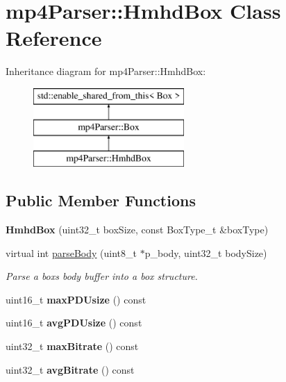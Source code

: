 \hypertarget{classmp4_parser_1_1_hmhd_box}{}\section{mp4\+Parser\+::Hmhd\+Box Class Reference}
\label{classmp4_parser_1_1_hmhd_box}
Inheritance diagram for mp4\+Parser\+::Hmhd\+Box\+:\begin{figure}[H]
\begin{center}
\leavevmode
\includegraphics[height=3.000000cm]{classmp4_parser_1_1_hmhd_box}
\end{center}
\end{figure}
\subsection*{Public Member Functions}
\begin{DoxyCompactItemize}
\item 
\mbox{\label{classmp4_parser_1_1_hmhd_box_a9f1a3801904196c91fd927d0f44925e3}} 
{\bfseries Hmhd\+Box} (uint32\+\_\+t box\+Size, const Box\+Type\+\_\+t \&box\+Type)
\item 
virtual int \mbox{\hyperlink{classmp4_parser_1_1_hmhd_box_a78bdbbff24ea09eb8844323364879f78}{parse\+Body}} (uint8\+\_\+t $\ast$p\+\_\+body, uint32\+\_\+t body\+Size)
\begin{DoxyCompactList}\small\item\em Parse a box\textquotesingle{}s body buffer into a box structure. \end{DoxyCompactList}\item 
\mbox{\label{classmp4_parser_1_1_hmhd_box_ad4957ca5940ceedfa44670816f69991c}} 
uint16\+\_\+t {\bfseries max\+P\+D\+Usize} () const
\item 
\mbox{\label{classmp4_parser_1_1_hmhd_box_a8314a6d3edc870c6cda196349085d562}} 
uint16\+\_\+t {\bfseries avg\+P\+D\+Usize} () const
\item 
\mbox{\label{classmp4_parser_1_1_hmhd_box_a0ace5d6d42cdfcc4b7d0c6bcbe2f29f5}} 
uint32\+\_\+t {\bfseries max\+Bitrate} () const
\item 
\mbox{\label{classmp4_parser_1_1_hmhd_box_aef578828ba59694a583cef29f9a5ef81}} 
uint32\+\_\+t {\bfseries avg\+Bitrate} () const
\end{DoxyCompactItemize}

